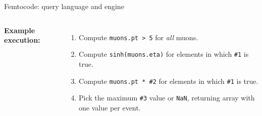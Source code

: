 \documentclass{beamer}
\begin{document}
\begin{frame}[fragile]{Femtocode: query language and engine}
\begin{columns}[t]
\small
\vspace{0.25 cm}
{\bf Example execution:}

\scriptsize
\begin{enumerate}
\item Compute {\tt\scriptsize muons.pt > 5} for {\it all} muons.
\item Compute {\tt\scriptsize sinh(muons.eta)} for elements in which {\tt\scriptsize \#1} is true.
\item Compute {\tt\scriptsize muons.pt * \#2} for elements in which {\tt\scriptsize \#1} is true.
\item Pick the maximum {\tt\scriptsize \#3} value or {\tt\scriptsize NaN}, returning array with one value per event.
\end{enumerate}

\end{columns}
\end{frame}
\end{document}
